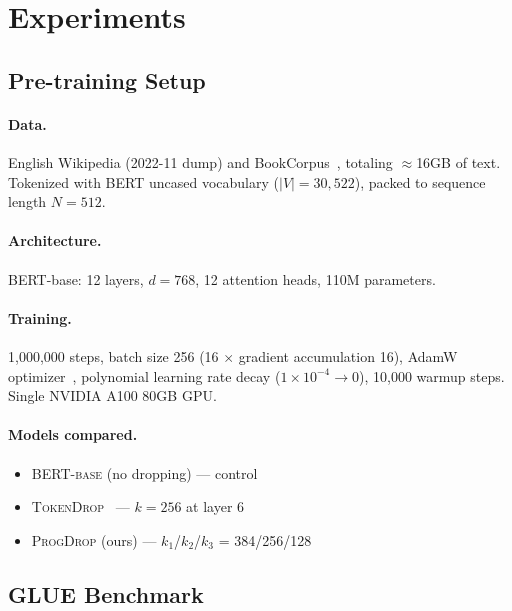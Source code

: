 \documentclass[11pt]{article}
\newcommand{\model}{\textsc{ProgDrop}}          %
\newcommand{\baseline}{\textsc{TokenDrop}}      %
\newcommand{\bertbase}{\textsc{BERT-base}}       %
\begin{document}
\section{Experiments}
\label{sec:experiments}

\subsection{Pre-training Setup}
\label{sec:pretrain_setup}

\paragraph{Data.}
English Wikipedia (2022-11 dump) and BookCorpus~\citep{zhu2015aligning},
totaling $\approx$16GB of text.
Tokenized with BERT uncased vocabulary ($|V|=30{,}522$), packed to
sequence length $N=512$.

\paragraph{Architecture.}
BERT-base: 12 layers, $d=768$, 12 attention heads, 110M parameters.

\paragraph{Training.}
1,000,000 steps, batch size 256 (16 $\times$ gradient accumulation 16),
AdamW optimizer~\citep{loshchilov2019adamw},
polynomial learning rate decay ($1 \times 10^{-4} \to 0$),
10,000 warmup steps.
Single NVIDIA A100 80GB GPU.

\paragraph{Models compared.}
\begin{itemize}
  \item \bertbase{} (no dropping) — control
  \item \baseline{}~\citep{hou2022tokendrop} — $k=256$ at layer 6
  \item \model{} (ours) — $k_1$/$k_2$/$k_3$ = 384/256/128
\end{itemize}

\subsection{GLUE Benchmark}
\label{sec:glue}
\end{document}
